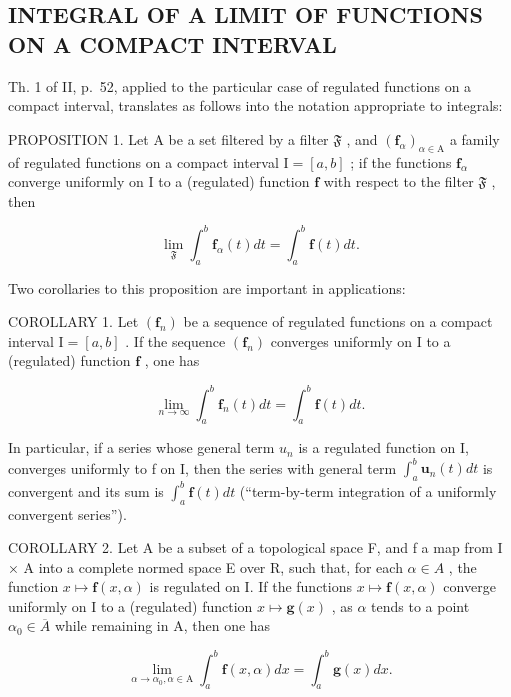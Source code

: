 \subsection{INTEGRAL OF A LIMIT OF FUNCTIONS ON A COMPACT INTERVAL}

Th. 1 of II, p.~52, applied to the particular case of regulated functions on a compact interval, translates as follows into the notation appropriate to integrals:

PROPOSITION 1. Let A be a set filtered by a filter \(\mathfrak{F}\) , and \((\mathbf{f}_{\alpha})_{\alpha \in \mathrm{A}}\) a family of regulated functions on a compact interval \(\mathrm{I} = [a, b]\) ; if the functions \(\mathbf{f}_{\alpha}\) converge uniformly on I to a (regulated) function \(\mathbf{f}\) with respect to the filter \(\mathfrak{F}\) , then

\[
\lim _ {\mathfrak {F}} \int_ {a} ^ {b} \mathbf {f} _ {\alpha} (t) d t = \int_ {a} ^ {b} \mathbf {f} (t) d t.\tag{1}
\]

Two corollaries to this proposition are important in applications:

COROLLARY 1. Let \((\mathbf{f}_n)\) be a sequence of regulated functions on a compact interval \(\mathrm{I} = [a, b]\) . If the sequence \((\mathbf{f}_n)\) converges uniformly on \(\mathrm{I}\) to a (regulated) function \(\mathbf{f}\) , one has

\[
\lim _ {n \rightarrow \infty} \int_ {a} ^ {b} \mathbf {f} _ {n} (t) d t = \int_ {a} ^ {b} \mathbf {f} (t) d t.\tag{2}
\]

In particular, if a series whose general term \(u_{n}\) is a regulated function on I, converges uniformly to f on I, then the series with general term \(\int_{a}^{b}\mathbf{u}_{n}(t)dt\) is convergent and its sum is \(\int_{a}^{b}\mathbf{f}(t)dt\) (``term-by-term integration of a uniformly convergent series'').

COROLLARY 2. Let A be a subset of a topological space F, and f a map from I × A into a complete normed space E over R, such that, for each \(\alpha \in A\) , the function \(x \mapsto \mathbf{f}(x, \alpha)\) is regulated on I. If the functions \(x \mapsto \mathbf{f}(x, \alpha)\) converge uniformly on I to a (regulated) function \(x \mapsto \mathbf{g}(x)\) , as \(\alpha\) tends to a point \(\alpha_{0} \in \overline{A}\) while remaining in A, then one has

\[
\lim _ {\alpha \rightarrow \alpha_ {0}, \alpha \in \mathrm{A}} \int_ {a} ^ {b} \mathbf {f} (x, \alpha) d x = \int_ {a} ^ {b} \mathbf {g} (x) d x.\tag{3}
\]


